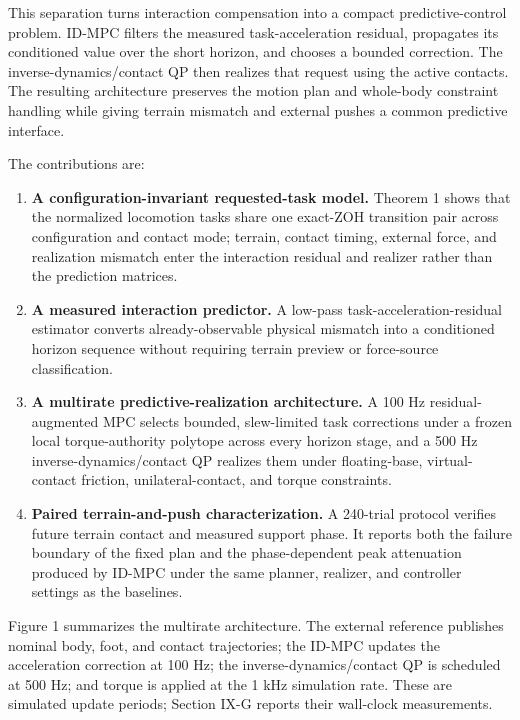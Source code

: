\documentclass[journal]{IEEEtran}
\theoremstyle{plain}
\theoremstyle{definition}
\begin{document}
This separation turns interaction compensation into a compact predictive-control problem. ID-MPC filters the measured task-acceleration residual, propagates its conditioned value over the short horizon, and chooses a bounded correction. The inverse-dynamics/contact QP then realizes that request using the active contacts. The resulting architecture preserves the motion plan and whole-body constraint handling while giving terrain mismatch and external pushes a common predictive interface.

The contributions are:

\begin{enumerate}
\def\labelenumi{\arabic{enumi}.}
\item
  \textbf{A configuration-invariant requested-task model.} Theorem 1 shows that the normalized locomotion tasks share one exact-ZOH transition pair across configuration and contact mode; terrain, contact timing, external force, and realization mismatch enter the interaction residual and realizer rather than the prediction matrices.
\item
  \textbf{A measured interaction predictor.} A low-pass task-acceleration-residual estimator converts already-observable physical mismatch into a conditioned horizon sequence without requiring terrain preview or force-source classification.
\item
  \textbf{A multirate predictive-realization architecture.} A 100 Hz residual-augmented MPC selects bounded, slew-limited task corrections under a frozen local torque-authority polytope across every horizon stage, and a 500 Hz inverse-dynamics/contact QP realizes them under floating-base, virtual-contact friction, unilateral-contact, and torque constraints.
\item
  \textbf{Paired terrain-and-push characterization.} A 240-trial protocol verifies future terrain contact and measured support phase. It reports both the failure boundary of the fixed plan and the phase-dependent peak attenuation produced by ID-MPC under the same planner, realizer, and controller settings as the baselines.
\end{enumerate}

Figure 1 summarizes the multirate architecture. The external reference publishes nominal body, foot, and contact trajectories; the ID-MPC updates the acceleration correction at 100 Hz; the inverse-dynamics/contact QP is scheduled at 500 Hz; and torque is applied at the 1 kHz simulation rate. These are simulated update periods; Section IX-G reports their wall-clock measurements.
\end{document}
